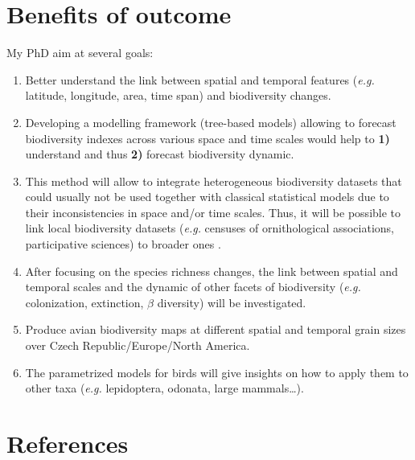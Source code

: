 \documentclass[
  12pt,
  oneside]{report}
\begin{document}
\hypertarget{benefits}{%
\chapter{Benefits of outcome}\label{benefits}}

My PhD aim at several goals:

\begin{enumerate}
\def\labelenumi{\arabic{enumi}.}
\item
  Better understand the link between spatial and temporal features (\emph{e.g.} latitude, longitude, area, time span) and biodiversity changes.
\item
  Developing a modelling framework (tree-based models) allowing to forecast biodiversity indexes across various space and time scales would help to \textbf{1)} understand and thus \textbf{2)} forecast biodiversity dynamic.
\item
  This method will allow to integrate heterogeneous biodiversity datasets that could usually not be used together with classical statistical models due to their inconsistencies in space and/or time scales. Thus, it will be possible to link local biodiversity datasets (\emph{e.g.} censuses of ornithological associations, participative sciences) to broader ones \autocite[\emph{e.g.} atlas, time-series assemblage such as Biotime database by][]{dornelas_biotime_2018}.
\item
  After focusing on the species richness changes, the link between spatial and temporal scales and the dynamic of other facets of biodiversity (\emph{e.g.} colonization, extinction, \(\beta\) diversity) will be investigated.
\item
  Produce avian biodiversity maps at different spatial and temporal grain sizes over Czech Republic/Europe/North America.
\item
  The parametrized models for birds will give insights on how to apply them to other taxa (\emph{e.g.} lepidoptera, odonata, large mammals\ldots).
\end{enumerate}


\singlespacing %
\chapter{References}\label{references}
{
\renewcommand{\clearpage}{}
\printbibliography[heading=none] %
}
\end{document}
